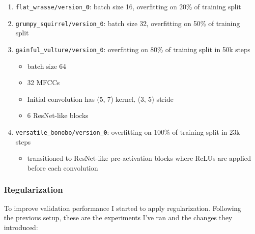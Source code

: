 \documentclass[11pt]{article}
\newcommand{\Log}[1]{{\small\texttt{#1}}}
\begin{document}
\begin{enumerate}
  \item \Log{flat\_wrasse/version\_0}: batch size 16, overfitting on 20\% of training split
  \item \Log{grumpy\_squirrel/version\_0}: batch size 32, overfitting on 50\% of training split
  \item \Log{gainful\_vulture/version\_0}: overfitting on 80\% of training split in 50k steps
    \begin{itemize}
      \item batch size 64
      \item 32 MFCCs
      \item Initial convolution has (5, 7) kernel, (3, 5) stride
      \item 6 ResNet-like blocks
    \end{itemize}
  \item \Log{versatile\_bonobo/version\_0}: overfitting on 100\% of training split in 23k steps
    \begin{itemize}
      \item transitioned to ResNet-like pre-activation blocks where ReLUs are
        applied before each convolution
    \end{itemize}
\end{enumerate}

\subsubsection{Regularization}

To improve validation performance I started to apply regularization. Following
the previous setup, these are the experiments I've ran and the changes they
introduced:
\end{document}
